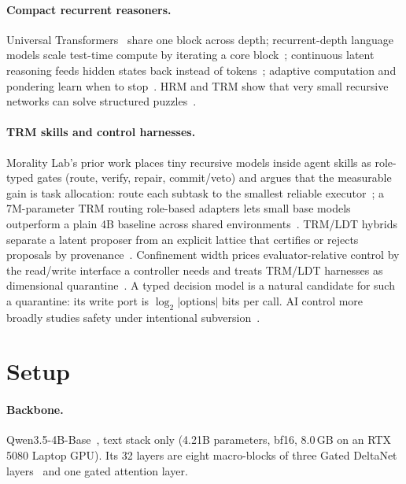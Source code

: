 \documentclass[11pt]{article}
\begin{document}
\paragraph{Compact recurrent reasoners.} Universal Transformers~\cite{dehghani2019universal} share
one block across depth; recurrent-depth language models scale test-time compute by iterating a core
block~\cite{geiping2025recurrent}; continuous latent reasoning feeds hidden states back instead of
tokens~\cite{hao2024coconut}; adaptive computation and pondering learn when to
stop~\cite{graves2016act,banino2021pondernet}. HRM and TRM show that very small recursive networks
can solve structured puzzles~\cite{wang2025hrm,jolicoeurmartineau2025trm}.

\paragraph{TRM skills and control harnesses.} Morality Lab's prior work places tiny recursive models
inside agent skills as role-typed gates (route, verify, repair, commit/veto) and argues that the
measurable gain is task allocation: route each subtask to the smallest reliable
executor~\cite{dugan2026trmskills}; a 7M-parameter TRM routing role-based adapters lets small base
models outperform a plain 4B baseline across shared environments~\cite{dugan2026trmrouting}. TRM/LDT hybrids separate a latent proposer from an explicit
lattice that certifies or rejects proposals by provenance~\cite{dugan2026trmldt}. Confinement width
prices evaluator-relative control by the read/write interface a controller needs and treats TRM/LDT
harnesses as dimensional quarantine~\cite{dugan2026confinement}. A typed decision model is a natural
candidate for such a quarantine: its write port is $\log_2|\text{options}|$ bits per call. AI
control more broadly studies safety under intentional subversion~\cite{greenblatt2023control}.

\section{Setup}
\label{sec:setup}

\paragraph{Backbone.} Qwen3.5-4B-Base~\cite{qwen2026qwen35}, text stack only (4.21B parameters,
bf16, 8.0\,GB on an RTX 5080 Laptop GPU). Its 32 layers are eight macro-blocks of three Gated
DeltaNet layers~\cite{yang2024gateddeltanet} and one gated attention layer.
\end{document}

